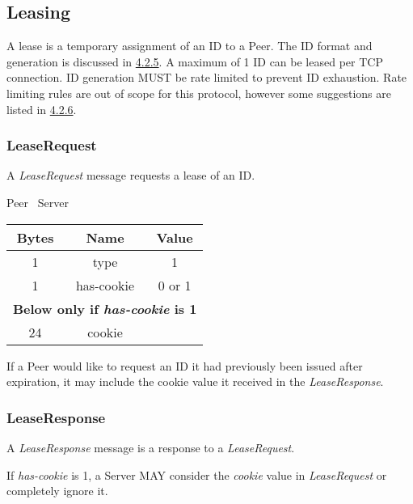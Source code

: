 \documentclass{article}
\begin{document}
    \subsection{Leasing}

    A lease is a temporary assignment of an ID to a Peer. The ID format and generation is discussed in
    \hyperlink{subsubsection.4.2.5}{4.2.5}. A maximum of 1 ID can be leased per TCP connection. ID generation MUST be
    rate
    limited to prevent ID exhaustion. Rate
    limiting rules
    are out of scope for this protocol, however some suggestions are listed in \hyperlink{subsubsection.4.2.6}{4.2.6}.

    \subsubsection{LeaseRequest}

    A \emph{LeaseRequest} message requests a lease of an ID.

    \begin{center}
        Peer \textrightarrow\ Server\\
        \begin{tabular}{|c|c|c|}
            \hline
            \textbf{Bytes} & \textbf{Name} & \textbf{Value} \\
            \hline
            1              & type          & 1              \\
            \hline
            1              & has-cookie    & 0 or 1         \\
            \hline
            \multicolumn{3}{|c|}{\textbf{Below only if \emph{has-cookie} is 1} } \\
            \hline
            24             & cookie        &                \\
            \hline
        \end{tabular}
    \end{center}

    If a Peer would like to request an ID it had previously been issued after expiration, it may include the cookie
    value it received in the \emph{LeaseResponse}.

    \subsubsection{LeaseResponse}

    A \emph{LeaseResponse} message is a response to a \emph{LeaseRequest}.

    If \emph{has-cookie} is 1, a Server MAY consider the \emph{cookie} value in \emph{LeaseRequest} or completely
    ignore it.
\end{document}
